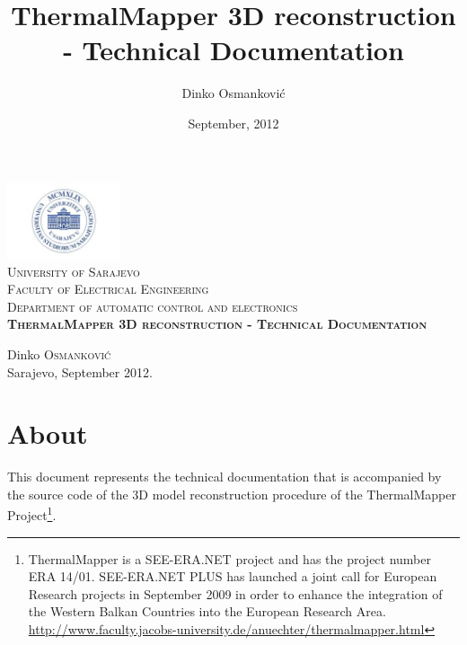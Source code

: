\documentclass[11pt]{article} %
\title{ThermalMapper 3D reconstruction - Technical Documentation}
\author{Dinko Osmanković}
\date{September, 2012} %
\begin{document}
\begin{titlepage}

\begin{center}


\includegraphics[width=0.25\textwidth]{unsa}\\[1cm]    

\textsc{\Large University of Sarajevo}\\[0.2cm]
\textsc{\Large Faculty of Electrical Engineering}\\[0.2cm]
\textsc{\Large Department of automatic control and electronics}\\[7cm]

\textsc{\LARGE \textbf{ThermalMapper 3D reconstruction - Technical Documentation}}
\\


\vfill
\begin{center}
Dinko \textsc{Osmanković}\\
\vspace{5mm}
Sarajevo, September 2012.
\end{center}
\end{center}
\end{titlepage}



\newpage

\tableofcontents

\newpage


\section{About}

This document represents the technical documentation that is accompanied by the source code of the 3D model reconstruction procedure of the ThermalMapper Project\footnote{ThermalMapper is a SEE-ERA.NET project and has the project number ERA 14/01. SEE-ERA.NET PLUS has launched a joint call for European Research projects in September 2009 in order to enhance the integration of the Western Balkan Countries into the European Research Area. \url{http://www.faculty.jacobs-university.de/anuechter/thermalmapper.html}}.
\end{document}
